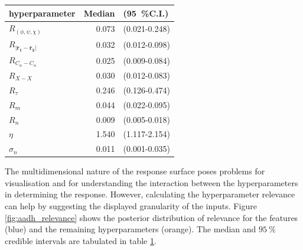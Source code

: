 \begin{table}
    \centering
    \begin{tabular}{|l|r|l|}
    \hline
                             hyperparameter &  Median &     (\SI{95}{\percent}C.I.) \\
    \hline\hline
                    $R_{(\phi, \psi, \chi)}$ &   0.073 &  (0.021-0.248) \\
     $R_{|\mathbf{r_{1}} - \mathbf{r_{2}}|}$ &   0.032 &  (0.012-0.098) \\
                 $R_{C_{\alpha}-C_{\alpha}}$ &   0.025 &  (0.009-0.084) \\
                                   $R_{X-X}$ &   0.030 &  (0.012-0.083) \\
                                  $R_{\tau}$ &   0.246 &  (0.126-0.474) \\
                                     $R_{m}$ &   0.044 &  (0.022-0.095) \\
                                     $R_{n}$ &   0.009 &  (0.005-0.018) \\
                                      $\eta$ &   1.540 &  (1.117-2.154) \\
                                  $\sigma_n$ &   0.011 &  (0.001-0.035) \\
    \hline
    \end{tabular}
    \label{tab:aadh_rel}
\end{table}

The multidimensional nature of the response surface poses problems for visualisation and for understanding the interaction between the hyperparameters in determining the response. However, calculating the hyperparameter relevance can help by suggesting the displayed granularity of the inputs. Figure \ref{fig:aadh_relevance} shows the posterior distribution of relevance for the features (blue) and the remaining hyperparameters (orange). The median and $\SI{95}{\percent}$ credible intervals are tabulated in table \ref{tab:aadh_rel}. 

